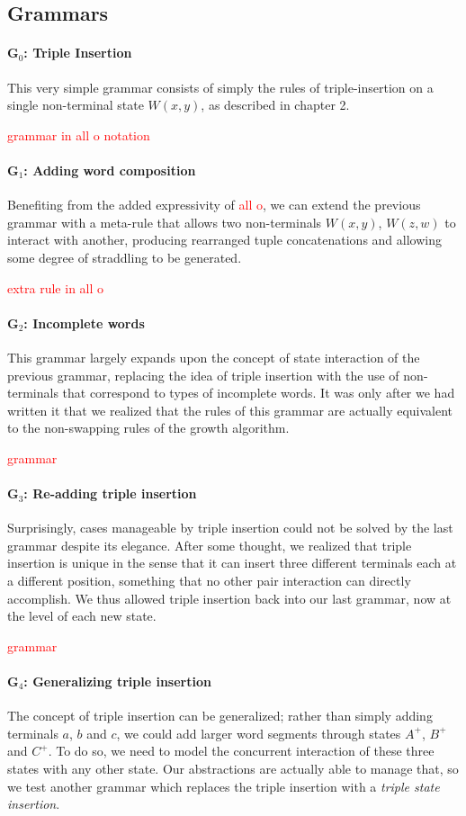 \documentclass[nonatbib,numbers,10pt]{sigplanconf}
\newcommand\todo[1]{\textcolor{red}{#1}}
\begin{document}
\subsection{Grammars}
\paragraph{G$_0$: Triple Insertion}
This very simple grammar consists of simply the rules of triple-insertion on a single non-terminal state $W(x,y)$, as described in chapter 2.

\todo{grammar in all o notation}
\paragraph{G$_1$: Adding word composition}
Benefiting from the added expressivity of \todo{all o}, we can extend the previous grammar with a meta-rule that allows two non-terminals $W(x,y)$, $W(z,w)$ to interact with another, producing rearranged tuple concatenations and allowing some degree of straddling to be generated.

\todo{extra rule in all o}
\paragraph{G$_2$: Incomplete words}
This grammar largely expands upon the concept of state interaction of the previous grammar, replacing the idea of triple insertion with the use of non-terminals that correspond to types of incomplete words. It was only after we had written it that we realized that the rules of this grammar are actually equivalent to the non-swapping rules of the growth algorithm.

\todo{grammar}
\paragraph{G$_3$: Re-adding triple insertion}
Surprisingly, cases manageable by triple insertion could not be solved by the last grammar despite its elegance. After some thought, we realized that triple insertion is unique in the sense that it can insert three different terminals each at a different position, something that no other pair interaction can directly accomplish. We thus allowed triple insertion back into our last grammar, now at the level of each new state.

\todo{grammar}

\paragraph{G$_4$: Generalizing triple insertion}
The concept of triple insertion can be generalized; rather than simply adding terminals $a$, $b$ and $c$, we could add larger word segments through states $A^{+}$, $B^{+}$ and $C^{+}$. To do so, we need to model the concurrent interaction of these three states with any other state. Our abstractions are actually able to manage that, so we test another grammar which replaces the triple insertion with a \textit{triple state insertion}.
\end{document}
